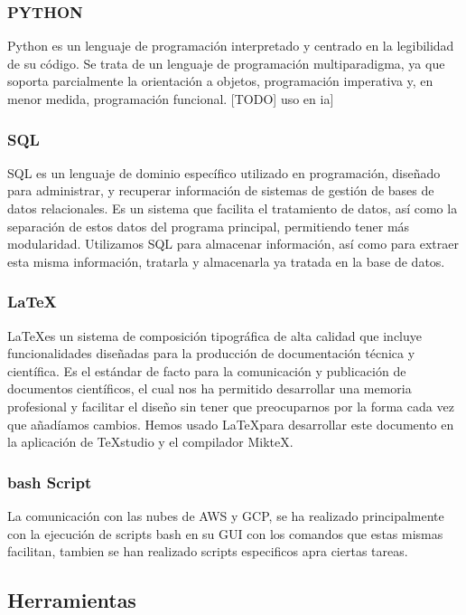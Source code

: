 \subsubsection*{PYTHON}
Python es un lenguaje de programación interpretado y centrado en la legibilidad de su código. Se trata de un lenguaje de programación multiparadigma, ya que soporta parcialmente la orientación a objetos, programación imperativa y, en menor medida, programación funcional. [TODO] uso en ia]

\subsubsection*{SQL}
SQL es un lenguaje de dominio específico utilizado en programación, diseñado para administrar, y recuperar información de sistemas de gestión de bases de datos relacionales. Es un sistema que facilita el tratamiento de datos, así como la separación de estos datos del programa principal, permitiendo tener más modularidad.
Utilizamos SQL para almacenar información, así como para extraer esta misma información, tratarla y almacenarla ya tratada en la base de datos. 

\subsubsection*{\LaTeX} \label{latexDef}
\LaTeX\space es un sistema de composición tipográfica de alta calidad que incluye funcionalidades diseñadas para la producción de documentación técnica y científica. Es el estándar de facto para la comunicación y publicación de documentos científicos, el cual nos ha permitido desarrollar una memoria profesional y facilitar el diseño sin tener que preocuparnos por la forma cada vez que añadíamos cambios.       
Hemos usado \LaTeX\space para desarrollar este documento en la aplicación de TeXstudio y el compilador MikteX.

\subsubsection*{bash Script}
La comunicación con las nubes de AWS y GCP, se ha realizado principalmente con la ejecución de scripts bash en su GUI con los comandos que estas mismas facilitan, tambien se han realizado scripts especificos apra ciertas tareas.

\subsection{Herramientas} 

